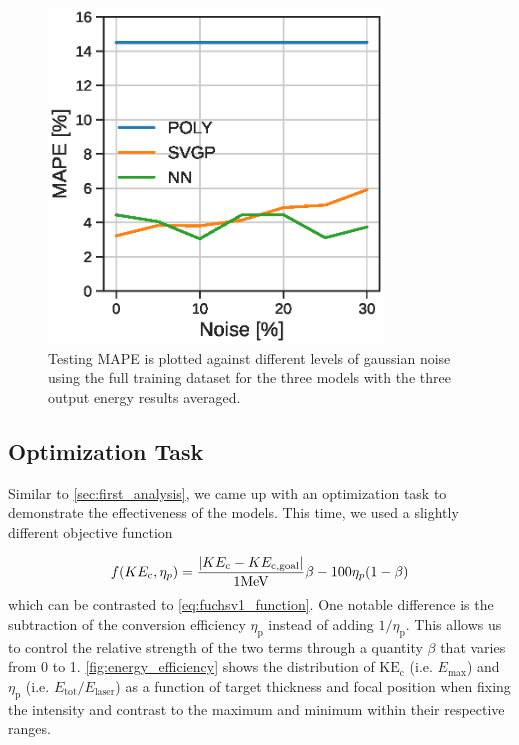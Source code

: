 \begin{figure}
	\centering
	\includegraphics[width=3.5in]{planning/images/paper2/fig5.eps}
	\caption{Testing MAPE is plotted against different levels of gaussian noise using the full training dataset for the three models with the three output energy results averaged.}
	\label{fig:noise_accuracy}
\end{figure}

\subsection{Optimization Task}
Similar to \autoref{sec:first_analysis}, we came up with an optimization task to demonstrate the effectiveness of the models. This time, we used a slightly different objective function 

\begin{equation}
	f(KE_{\rm c},\eta_{p}) = \frac{|KE_{\rm c} - KE_{\rm c,goal}|}{1 \text{MeV}} \beta - 100 \eta_{p} (1-\beta) \label{eq:obj_function_v2}
\end{equation}
which can be contrasted to \autoref{eq:fuchsv1_function}. One notable difference is the subtraction of the conversion efficiency $\eta_\text{p}$ instead of adding $1 / \eta_\text{p}$. This allows us to control the relative strength of the two terms through a quantity $\beta$ that varies from 0 to 1. \autoref{fig:energy_efficiency} shows the distribution of $\text{KE}_\text{c}$ (i.e. $E_\text{max}$) and $\eta_\text{p}$ (i.e. $E_\text{tot} / E_\text{laser}$) as a function of target thickness and focal position when fixing the intensity and contrast to the maximum and minimum within their respective ranges.

